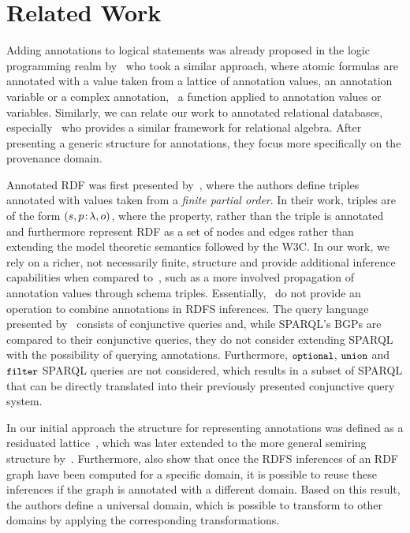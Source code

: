 \section{Related Work}
\label{sec:related}

Adding annotations to logical statements was already proposed in the logic programming realm
by~\citet{KiferSubrahmanian:1992aa} who took a similar approach, where atomic formulas are annotated with a value taken
from a lattice of annotation values, an annotation variable or a complex annotation, \ie~a function applied to
annotation values or variables.
%
Similarly, we can relate our work to annotated relational databases, especially~\citet{GreenKarvounarakisTannen:2007aa}
who provides a similar framework for relational algebra.  After presenting a generic structure for annotations, they
focus more specifically on the provenance domain. 


Annotated RDF was first presented by~\citet{UdreaRecuperoSubrahmanian:2006aa,UdreaRecuperoSubrahmanian:2010aa}, where the
authors define triples annotated with values taken from a \emph{finite partial order}.
%
In their work, triples are of the form $(s,p\!:\!\lambda,o)$, where the property, rather than the triple is
annotated and furthermore represent \ac{RDF} as a set of nodes and edges rather than extending the model theoretic
semantics followed by the \ac{W3C}.
%
In our work, we rely on a richer, not necessarily finite, structure and provide additional inference capabilities when
compared to~\citet{UdreaRecuperoSubrahmanian:2010aa}, such as a more involved propagation of annotation values through
schema triples.
%
Essentially,~\citeauthor{UdreaRecuperoSubrahmanian:2010aa} do not provide an operation to combine annotations in
\ac{RDFS} inferences. 
%
The query language presented by~\citet{UdreaRecuperoSubrahmanian:2010aa} consists of conjunctive queries and, while
SPARQL's \acp{BGP} are compared to their conjunctive queries, they do not consider extending SPARQL with the possibility
of querying annotations. Furthermore, $\texttt{{\small optional}}$, $\texttt{{\small union}}$ and $\texttt{{\small filter}}$ SPARQL queries are
not considered, which results in a subset of SPARQL that can be directly translated into their previously presented
conjunctive query system.

In our initial approach the structure for representing annotations was defined as a residuated
lattice~\cite{StracciaLopesLukacsy:2010aa,LopesPolleresStraccia:2010aa}, which was later extended to the more general
semiring structure by~\citet{BunemanKostylev:2010aa}.
%
Furthermore, \citet{BunemanKostylev:2010aa} also show that once the \ac{RDFS} inferences of an \ac{RDF} graph have been
computed for a specific domain, it is possible to reuse these inferences if the graph is annotated with a different
domain.  Based on this result, the authors define a universal domain, which is possible to transform to other domains by
applying the corresponding transformations.


